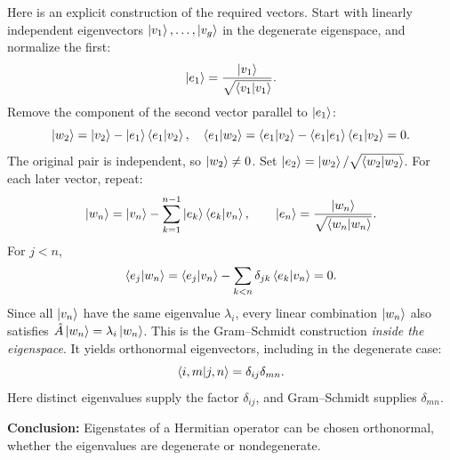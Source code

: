 Here is an explicit construction of the required vectors. Start with
linearly independent eigenvectors $\left|v_1\right\rangle,\dots,\left|v_g\right\rangle$ in the
degenerate eigenspace, and normalize the first:
\begin{equation}
\left|e_1\right\rangle=\frac{\left|v_1\right\rangle}{\sqrt{\left\langle v_1\middle|v_1\right\rangle}}.
\end{equation}
Remove the component of the second vector parallel to $\left|e_1\right\rangle$:
\begin{equation}
\left|w_2\right\rangle=\left|v_2\right\rangle-\left|e_1\right\rangle\left\langle e_1\middle|v_2\right\rangle,
\quad
\left\langle e_1\middle|w_2\right\rangle=\left\langle e_1\middle|v_2\right\rangle
-\left\langle e_1\middle|e_1\right\rangle\left\langle e_1\middle|v_2\right\rangle=0.
\end{equation}
The original pair is independent, so $\left|w_2\right\rangle\ne0$.
Set $\left|e_2\right\rangle=\left|w_2\right\rangle/\sqrt{\left\langle w_2\middle|w_2\right\rangle}$.
For each later vector, repeat:
\begin{equation}
\left|w_n\right\rangle=\left|v_n\right\rangle-\sum_{k=1}^{n-1}
 \left|e_k\right\rangle\left\langle e_k\middle|v_n\right\rangle,
\qquad
\left|e_n\right\rangle=\frac{\left|w_n\right\rangle}{\sqrt{\left\langle w_n\middle|w_n\right\rangle}}.
\end{equation}
For $j<n$,
\begin{equation}
\left\langle e_j\middle|w_n\right\rangle=\left\langle e_j\middle|v_n\right\rangle
-\sum_{k<n}\delta_{jk}\left\langle e_k\middle|v_n\right\rangle=0.
\end{equation}
Since all $\left|v_n\right\rangle$ have the same eigenvalue $\lambda_i$,
every linear combination $\left|w_n\right\rangle$ also satisfies
$\hat{A}\left|w_n\right\rangle=\lambda_i\left|w_n\right\rangle$.
This is the Gram--Schmidt construction \emph{inside the eigenspace}.
It yields orthonormal eigenvectors, including in the degenerate case:
\begin{equation}
\left\langle i,m\middle|j,n\right\rangle=\delta_{ij}\delta_{mn}.
\end{equation}
Here distinct eigenvalues supply the factor $\delta_{ij}$,
and Gram--Schmidt supplies $\delta_{mn}$.

\textbf{Conclusion:} Eigenstates of a Hermitian operator can be chosen orthonormal, whether the eigenvalues are degenerate or nondegenerate.
